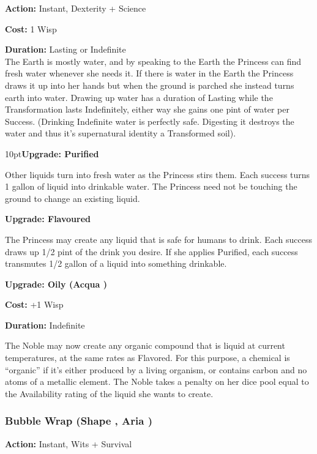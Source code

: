 \noindent \textbf{Action:} Instant, Dexterity + Science

\noindent \textbf{Cost:} 1 Wisp

\noindent \textbf{Duration:} Lasting or Indefinite\\

\noindent The Earth is mostly water, and by speaking to the Earth the Princess can find fresh water whenever she needs it. If there is water in the Earth the Princess draws it up into her hands but when the ground is parched she instead turns earth into water. Drawing up water has a duration of Lasting while the Transformation lasts Indefinitely, either way she gains one pint of water per Success. (Drinking Indefinite water is perfectly safe. Digesting it destroys the water and thus it's supernatural identity a Transformed soil).

\begin{myindentpar}{10pt}\textbf{Upgrade: Purified}

Other liquids turn into fresh water as the Princess stirs them. Each success turns 1 gallon of liquid into drinkable water. The Princess need not be touching the ground to change an existing liquid.

\textbf{Upgrade: Flavoured}

The Princess may create any liquid that is safe for humans to drink. Each success draws up 1/2 pint of the drink you desire. If she applies Purified, each success transmutes 1/2 gallon of a liquid into something drinkable.

\textbf{Upgrade: Oily (Acqua \textbullet\textbullet)}

\noindent \textbf{Cost:} +1 Wisp

\noindent \textbf{Duration:} Indefinite

\noindent The Noble may now create any organic compound that is liquid at current temperatures, at the same rates as Flavored. For this purpose, a chemical is “organic” if it’s either produced by a living organism, or contains carbon and no atoms of a metallic element. The Noble takes a penalty on her dice pool equal to the Availability rating of the liquid she wants to create.
\end{myindentpar}


\subsubsection*{Bubble Wrap (Shape \textbullet, Aria \textbullet)}
\noindent \textbf{Action:} Instant, Wits + Survival\\

